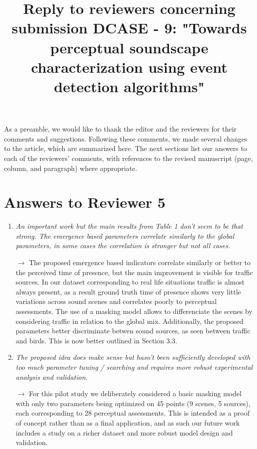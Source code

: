 \documentclass[10pt]{article}
\title{Reply to reviewers concerning submission DCASE - 9: "Towards perceptual soundscape characterization using event detection algorithms"}
\begin{document}
\maketitle

As a preamble, we would like to thank the editor and the reviewers for their comments and suggestions. Following these comments, we made several changes to the article, which are summarized here. The next sections list our answers to each of the reviewers’ comments, with references to the revised manuscript (page, column, and paragraph) where appropriate.


\section{Answers to Reviewer 5}

\begin{enumerate}

\item \emph{An important work but the main results from Table 1 don't seem to be that strong. The emergence based parameters correlate similarly to the global parameters, in some cases the correlation is stronger but not all cases.}

$\rightarrow$ The proposed emergence based indicators correlate similarly or better to the perceived time of presence, but the main improvement is visible for traffic sources. In our dataset corresponding to real life situations traffic is almost always present, as a result ground truth time of presence shows very little variations across sound scenes and correlates poorly to perceptual assessments. The use of a masking model allows to differenciate the scenes by considering traffic in relation to the global mix. Additionally, the proposed parameters better discriminate betwen sound sources, as seen between traffic and birds. This is now better outlined in Section 3.3.

\item \emph{The proposed idea does make sense but hasn't been sufficiently developed with too much parameter tuning / searching and requires more robust experimental analysis and validation.}

$\rightarrow$ For this pilot study we deliberately considered a basic masking model with only two parameters being optimized on 45 points (9 scenes, 5 sources), each corresponding to 28 perceptual assessments. This is intended as a proof of concept rather than as a final application, and as such our future work includes a study on a richer dataset and more robust model design and validation.

\end{enumerate}
\end{document}
